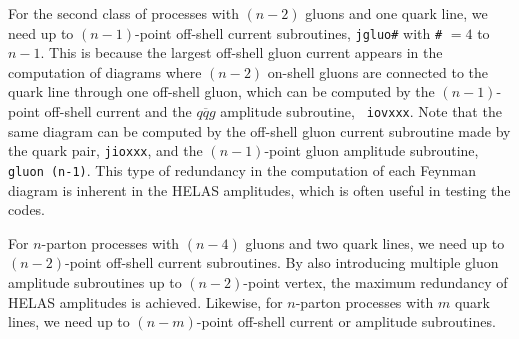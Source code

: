 \documentclass[a4paper,11pt]{article}
\begin{document}
For the
  second class of processes with $(n-2)$ gluons and one quark line, we
  need up to $(n-1)$-point off-shell current subroutines, {\tt jgluo\#}
  with {\tt \#} $=4$ to $n-1$. This is because the largest off-shell
  gluon current appears in the computation of diagrams where $(n-2)$ on-shell gluons are connected to
  the quark line through one off-shell gluon, which can be computed by the $(n-1)$-point off-shell
  current and the $q\overline{q}g$ amplitude subroutine, {\tt
  iovxxx}. Note that the same diagram can be computed by the off-shell
  gluon current subroutine made by the quark pair, {\tt jioxxx}, and the
  $(n-1)$-point gluon amplitude subroutine, {\tt gluon\,(n-1)}. This
  type of redundancy in the computation of each Feynman diagram is
  inherent in the HELAS amplitudes, which is often useful in testing the
  codes.

 For $n$-parton processes with $(n-4)$ gluons and two quark lines, we need
up to $(n-2)$-point off-shell current subroutines. By also introducing
multiple gluon amplitude subroutines up to $(n-2)$-point vertex, the maximum
redundancy of HELAS amplitudes is achieved. Likewise, for $n$-parton
processes with $m$ quark lines, we need up to $(n-m)$-point off-shell
current or amplitude subroutines.
 
\end{document}

